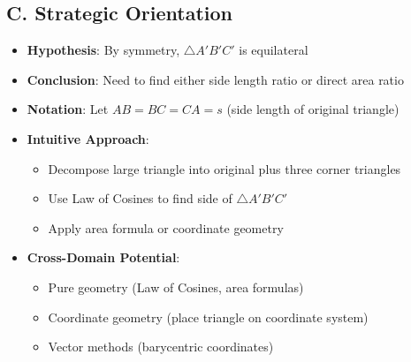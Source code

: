 \documentclass[11pt]{article}
\begin{document}
\begin{problemconfigbox}
\subsection*{C. Strategic Orientation}
\begin{itemize}[leftmargin=*]
    \item \textbf{Hypothesis}: By symmetry, $\triangle A'B'C'$ is equilateral
    \item \textbf{Conclusion}: Need to find either side length ratio or direct area ratio
    \item \textbf{Notation}: Let $AB = BC = CA = s$ (side length of original triangle)
    \item \textbf{Intuitive Approach}: 
    \begin{itemize}
        \item Decompose large triangle into original plus three corner triangles
        \item Use Law of Cosines to find side of $\triangle A'B'C'$
        \item Apply area formula or coordinate geometry
    \end{itemize}
    \item \textbf{Cross-Domain Potential}: 
    \begin{itemize}
        \item Pure geometry (Law of Cosines, area formulas)
        \item Coordinate geometry (place triangle on coordinate system)
        \item Vector methods (barycentric coordinates)
    \end{itemize}
\end{itemize}
\end{problemconfigbox}
\end{document}
